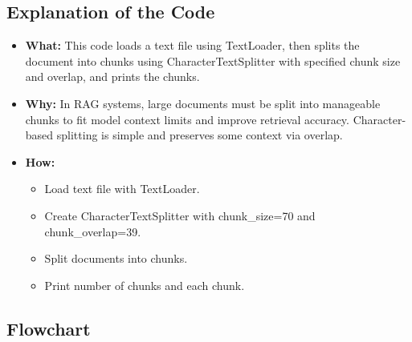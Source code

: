 \documentclass[11pt, a4paper]{article}
\begin{document}
\subsection{Explanation of the Code}
\begin{itemize}
    \item \textbf{What:} This code loads a text file using TextLoader, then splits the document into chunks using CharacterTextSplitter with specified chunk size and overlap, and prints the chunks.
    \item \textbf{Why:} In RAG systems, large documents must be split into manageable chunks to fit model context limits and improve retrieval accuracy. Character-based splitting is simple and preserves some context via overlap.
    \item \textbf{How:}
    \begin{itemize}
        \item Load text file with TextLoader.
        \item Create CharacterTextSplitter with chunk\_size=70 and chunk\_overlap=39.
        \item Split documents into chunks.
        \item Print number of chunks and each chunk.
    \end{itemize}
\end{itemize}

\subsection{Flowchart}
\end{document}
